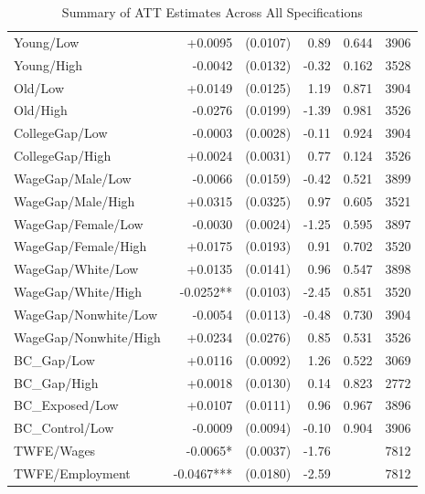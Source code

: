 \begin{table}[ht]
\begin{tabular}{lrrrrr}
  Young/Low & +0.0095 & (0.0107) & 0.89 & 0.644 & 3906 \\ 
  Young/High & -0.0042 & (0.0132) & -0.32 & 0.162 & 3528 \\ 
  Old/Low & +0.0149 & (0.0125) & 1.19 & 0.871 & 3904 \\ 
  Old/High & -0.0276 & (0.0199) & -1.39 & 0.981 & 3526 \\ 
  CollegeGap/Low & -0.0003 & (0.0028) & -0.11 & 0.924 & 3904 \\ 
  CollegeGap/High & +0.0024 & (0.0031) & 0.77 & 0.124 & 3526 \\ 
  WageGap/Male/Low & -0.0066 & (0.0159) & -0.42 & 0.521 & 3899 \\ 
  WageGap/Male/High & +0.0315 & (0.0325) & 0.97 & 0.605 & 3521 \\ 
  WageGap/Female/Low & -0.0030 & (0.0024) & -1.25 & 0.595 & 3897 \\ 
  WageGap/Female/High & +0.0175 & (0.0193) & 0.91 & 0.702 & 3520 \\ 
  WageGap/White/Low & +0.0135 & (0.0141) & 0.96 & 0.547 & 3898 \\ 
  WageGap/White/High & -0.0252** & (0.0103) & -2.45 & 0.851 & 3520 \\ 
  WageGap/Nonwhite/Low & -0.0054 & (0.0113) & -0.48 & 0.730 & 3904 \\ 
  WageGap/Nonwhite/High & +0.0234 & (0.0276) & 0.85 & 0.531 & 3526 \\ 
  BC_Gap/Low & +0.0116 & (0.0092) & 1.26 & 0.522 & 3069 \\ 
  BC_Gap/High & +0.0018 & (0.0130) & 0.14 & 0.823 & 2772 \\ 
  BC_Exposed/Low & +0.0107 & (0.0111) & 0.96 & 0.967 & 3896 \\ 
  BC_Control/Low & -0.0009 & (0.0094) & -0.10 & 0.904 & 3906 \\ 
  TWFE/Wages & -0.0065* & (0.0037) & -1.76 &  & 7812 \\ 
  TWFE/Employment & -0.0467*** & (0.0180) & -2.59 &  & 7812 \\ 
   \bottomrule
\end{tabular}
\caption{Summary of ATT Estimates Across All Specifications} 
\label{tab:att_master}
\end{table}
